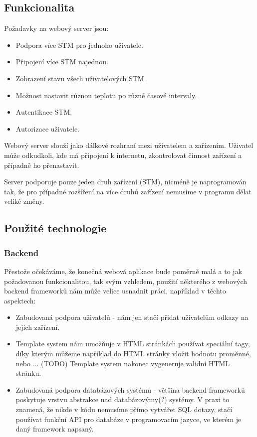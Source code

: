 
\subsection{Funkcionalita}
Požadavky na webový server jsou:
\begin{itemize}
  \item Podpora více STM pro jednoho uživatele.
  \item Připojení více STM najednou.
  \item Zobrazení stavu všech uživatelových STM.
  \item Možnost nastavit různou teplotu po různé časové intervaly.
  \item Autentikace STM.
  \item Autorizace uživatele.
\end{itemize}
Webový server slouží jako dálkové rozhraní mezi uživatelem a zařízením.
Uživatel může odkudkoli, kde má připojení k internetu, zkontrolovat činnost zařízení
a případně ho přenastavit.

Server podporuje pouze jeden druh zařízení (STM), nicméně je naprogramován
tak, že pro případné rozšíření na více druhů zařízení nemusíme v programu dělat veliké
změny.

\subsection{Použité technologie}

\subsubsection{Backend}
Přestože očekáváme, že konečná webová aplikace bude poměrně malá a to jak požadovanou funkcionalitou, tak svým
vzhledem, použití některého z webových backend frameworků nám může velice usnadnit práci, například v těchto
aspektech:
\begin{itemize}
    \item Zabudovaná podpora uživatelů - nám jen stačí přidat uživatelům odkazy na jejich
        zařízení.
    \item Template system nám umožňuje v HTML stránkách používat speciální
        tagy, díky kterým můžeme například do HTML stránky vložit hodnotu proměnné, nebo ... (TODO)
        Template system nakonec vygeneruje validní HTML stránku.
    \item Zabudovaná podpora databázových systémů - většina backend frameworků poskytuje vrstvu abstrakce nad
        databázovýmy(?) systémy. V praxi to znamená, že nikde v kódu nemusíme přímo vytvářet SQL dotazy,
        stačí používat funkční API pro databáze v programovacím jazyce, ve kterém je daný framework napsaný.
\end{itemize}

